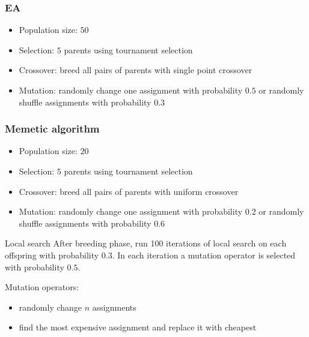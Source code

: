 \documentclass{beamer}
\begin{document}
\begin{frame}
    \frametitle{EA}
    \begin{itemize}
        \item Population size: $50$
        \item Selection: $5$ parents using tournament selection
        \item Crossover: breed all pairs of parents with single point crossover
        \item Mutation: randomly change one assignment with probability $0.5$ or randomly shuffle assignments with probability $0.3$
    \end{itemize}
\end{frame}

\begin{frame}
    \frametitle{Memetic algorithm}
    \begin{itemize}
        \item Population size: $20$
        \item Selection: $5$ parents using tournament selection
        \item Crossover: breed all pairs of parents with uniform crossover
        \item Mutation: randomly change one assignment with probability $0.2$ or randomly shuffle assignments with probability $0.6$
    \end{itemize}
    \begin{block}{Local search}
        After breeding phase, run 100 iterations of local search on each offspring with probability $0.3$.
        In each iteration a mutation operator is selected with probability $0.5$.

        Mutation operators:
        \begin{itemize}
            \item randomly change $n$ assignments
            \item find the most expensive assignment and replace it with cheapest
        \end{itemize}
    \end{block}
\end{frame}
\end{document}
